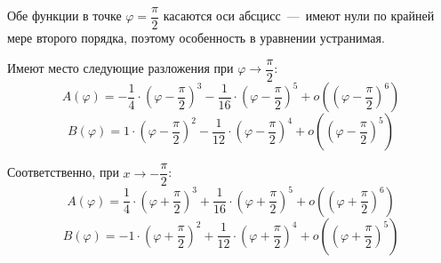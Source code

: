 \documentclass[2pt, a4paper, fleqn]{extarticle}
\begin{document}
Обе функции в точке $\varphi = \dfrac{\pi}{2}$ касаются оси абсцисс~---~имеют нули по крайней мере второго порядка, поэтому особенность в уравнении устранимая.

Имеют место следующие разложения при $\varphi\rightarrow\dfrac{\pi}{2}$: $$A(\varphi)=-\dfrac{1}{4}\cdot\left(\varphi-\dfrac{\pi}{2}\right)^3-\dfrac{1}{16}\cdot\left(\varphi-\dfrac{\pi}{2}\right)^5+o\left(\left(\varphi-\dfrac{\pi}{2}\right)^6\right)$$ $$B(\varphi) = 1\cdot\left(\varphi-\dfrac{\pi}{2}\right)^2-\dfrac{1}{12}\cdot \left(\varphi-\dfrac{\pi}{2}\right)^4+o\left(\left(\varphi-\dfrac{\pi}{2}\right)^5\right)$$

Соответственно, при $x\rightarrow-\dfrac{\pi}{2}$: $$A(\varphi)=\dfrac{1}{4}\cdot\left(\varphi+\dfrac{\pi}{2}\right)^3+\dfrac{1}{16}\cdot\left(\varphi+\dfrac{\pi}{2}\right)^5+o\left(\left(\varphi+\dfrac{\pi}{2}\right)^6\right)$$ $$B(\varphi) = -1\cdot\left(\varphi+\dfrac{\pi}{2}\right)^2+\dfrac{1}{12}\cdot \left(\varphi+\dfrac{\pi}{2}\right)^4+o\left(\left(\varphi+\dfrac{\pi}{2}\right)^5\right)$$

\end{document}
